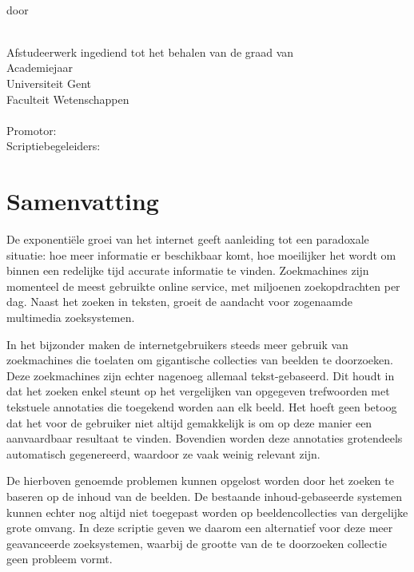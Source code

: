 \newpage
\thispagestyle{plain}

\begin{center}
{\sf\huge \titel }\\[3mm]
door\\
{\Large\auteur{}} \\
\end{center}
\noindent Afstudeerwerk ingediend tot het behalen van de graad van
\richting
\vspace{3mm}\\
Academiejaar \jaar
\vspace{3mm}\\
\noindent Universiteit Gent\\
Faculteit Wetenschappen\\
\vspace{3mm}\\
\noindent Promotor: \promotor\\
\noindent Scriptiebegeleiders: \begeleider\\
\vfill

\section*{Samenvatting}
De exponenti\"ele groei van het internet geeft aanleiding tot een paradoxale
situatie: hoe meer informatie er beschikbaar komt, hoe moeilijker het wordt
om binnen een redelijke tijd accurate informatie te vinden. Zoekmachines zijn momenteel
de meest gebruikte online service, met miljoenen zoekopdrachten per dag. Naast het zoeken
in teksten, groeit de aandacht voor zogenaamde multimedia zoeksystemen. 

In het bijzonder maken de internetgebruikers steeds meer gebruik van zoekmachines die toelaten om 
gigantische collecties van beelden te doorzoeken. Deze zoekmachines zijn echter nagenoeg 
allemaal tekst-gebaseerd. Dit houdt in dat het zoeken enkel steunt op het vergelijken van opgegeven 
trefwoorden met tekstuele annotaties die toegekend worden aan elk beeld. Het hoeft geen
betoog dat het voor de gebruiker niet altijd gemakkelijk is om op deze manier een aanvaardbaar 
resultaat te vinden. Bovendien worden deze annotaties grotendeels automatisch gegenereerd, 
waardoor ze vaak weinig relevant zijn.

De hierboven genoemde problemen kunnen opgelost worden door het zoeken te baseren op de inhoud 
van de beelden. De bestaande inhoud-gebaseerde systemen kunnen echter nog altijd niet 
toegepast worden op beeldencollecties van dergelijke grote omvang. In deze scriptie geven 
we daarom een alternatief voor deze meer geavanceerde zoeksystemen, waarbij de grootte van 
de te doorzoeken collectie geen probleem vormt. 

